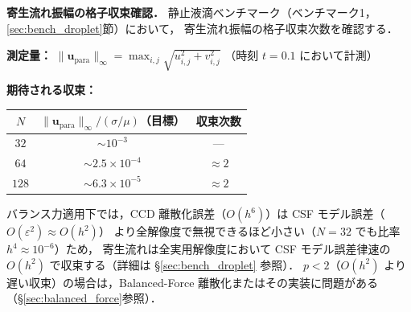 \noindent\textbf{寄生流れ振幅の格子収束確認．}
静止液滴ベンチマーク（ベンチマーク1，\ref{sec:bench_droplet}節）において，
寄生流れ振幅の格子収束次数を確認する．

\textbf{測定量：} $\|\bm{u}_\text{para}\|_\infty = \max_{i,j}\sqrt{u_{i,j}^2 + v_{i,j}^2}$
（時刻 $t = 0.1$ において計測）

\textbf{期待される収束：}
\begin{center}
\begin{tabular}{ccc}
\hline
$N$ & $\|\bm{u}_\text{para}\|_\infty / (\sigma/\mu)$（目標） & 収束次数 \\
\hline
$32$ & $\sim 10^{-3}$ & --- \\
$64$ & $\sim 2.5 \times 10^{-4}$ & $\approx 2$ \\
$128$ & $\sim 6.3 \times 10^{-5}$ & $\approx 2$ \\
\hline
\end{tabular}
\end{center}

バランス力適用下では，CCD 離散化誤差（$O(h^6)$）は CSF モデル誤差（$O(\varepsilon^2)\approx O(h^2)$）
より全解像度で無視できるほど小さい（$N=32$ でも比率 $h^4 \approx 10^{-6}$）ため，
寄生流れは全実用解像度において CSF モデル誤差律速の $O(h^2)$ で収束する（詳細は §\ref{sec:bench_droplet} 参照）．
$p < 2$（$O(h^2)$ より遅い収束）の場合は，Balanced-Force 離散化またはその実装に問題がある（§\ref{sec:balanced_force}参照）．

